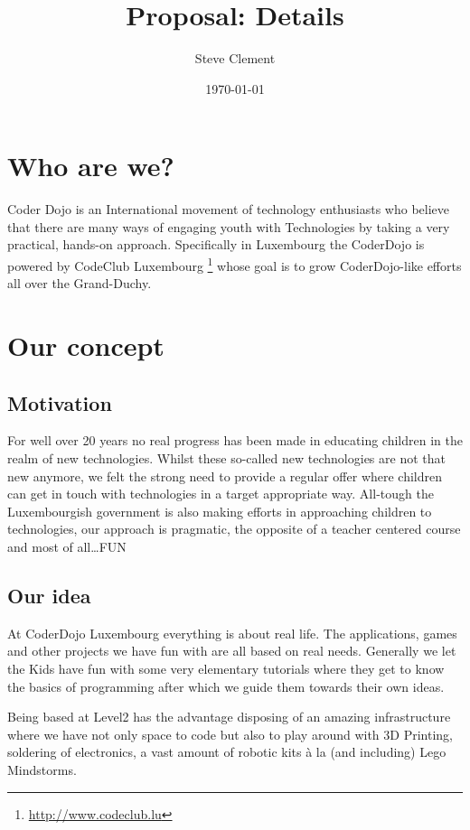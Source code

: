 \documentclass{proposal}
\title{Proposal: Details}
\author{Steve Clement}
\date{\today}
\begin{document}
\newpage

\maketitle

\newpage


\section*{Who are we?}

Coder Dojo is an International movement of technology enthusiasts who believe that there are many ways of engaging youth with Technologies by taking a very practical, hands-on approach.
Specifically in Luxembourg the CoderDojo is powered by CodeClub Luxembourg \footnote{\url{http://www.codeclub.lu}} whose goal is to grow CoderDojo-like efforts all over the Grand-Duchy.

\section*{Our concept}

\subsection*{Motivation}
For well over 20 years no real progress has been made in educating children in the realm of new technologies.
Whilst these so-called new technologies are not that new anymore, we felt the strong need to provide a regular offer where children can get in touch with technologies in a target appropriate way.
All-tough the Luxembourgish government is also making efforts in approaching children to technologies, our approach is pragmatic, the opposite of a teacher centered course and most of all\ldots FUN

\subsection*{Our idea}
At CoderDojo Luxembourg everything is about real life. The applications, games and other projects we have fun with are all based on real needs. Generally we let the Kids have fun with some very elementary tutorials where they get to know the basics of programming after which we guide them towards their own ideas.

Being based at Level2 has the advantage disposing of an amazing infrastructure where we have not only space to code but also to play around with 3D Printing, soldering of electronics, a vast amount of robotic kits à la (and including) Lego Mindstorms.
\end{document}
